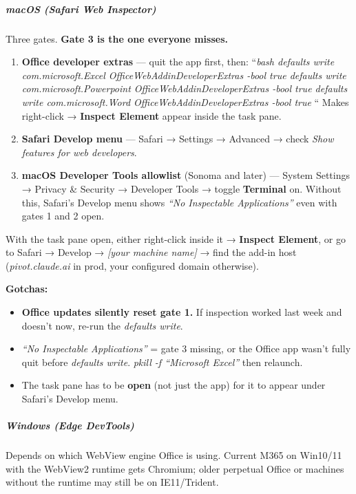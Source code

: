 \documentclass[11pt]{article}
\begin{document}
\subparagraph{macOS (Safari Web Inspector)}\mbox{}\par

Three gates. \textbf{Gate 3 is the one everyone misses.}


\begin{enumerate}[leftmargin=*,itemsep=2pt,topsep=2pt]
\item {} \textbf{Office developer extras} — quit the app first, then: ``\emph{bash defaults write com.microsoft.Excel OfficeWebAddinDeveloperExtras -bool true defaults write com.microsoft.Powerpoint OfficeWebAddinDeveloperExtras -bool true defaults write com.microsoft.Word OfficeWebAddinDeveloperExtras -bool true }`` Makes right-click → \textbf{Inspect Element} appear inside the task pane.
\item {} \textbf{Safari Develop menu} — Safari → Settings → Advanced → check \emph{Show features for web developers}.
\item {} \textbf{macOS Developer Tools allowlist} (Sonoma and later) — System Settings → Privacy \& Security → Developer Tools → toggle \textbf{Terminal} on. Without this, Safari's Develop menu shows \emph{``No Inspectable Applications''} even with gates 1 and 2 open.
\end{enumerate}

With the task pane open, either right-click inside it → \textbf{Inspect Element}, or go to Safari → Develop → \emph{[your machine name]} → find the add-in host (\emph{pivot.claude.ai} in prod, your configured domain otherwise).


\textbf{Gotchas:}

\begin{itemize}[leftmargin=*,itemsep=2pt,topsep=2pt]
\item {} \textbf{Office updates silently reset gate 1.} If inspection worked last week and doesn't now, re-run the \emph{defaults write}.
\item {} \emph{``No Inspectable Applications''} = gate 3 missing, or the Office app wasn't fully quit before \emph{defaults write}. \emph{pkill -f ``Microsoft Excel''} then relaunch.
\item {} The task pane has to be \textbf{open} (not just the app) for it to appear under Safari's Develop menu.
\end{itemize}

\subparagraph{Windows (Edge DevTools)}\mbox{}\par

Depends on which WebView engine Office is using. Current M365 on Win10/11 with the WebView2 runtime gets Chromium; older perpetual Office or machines without the runtime may still be on IE11/Trident.
\end{document}
